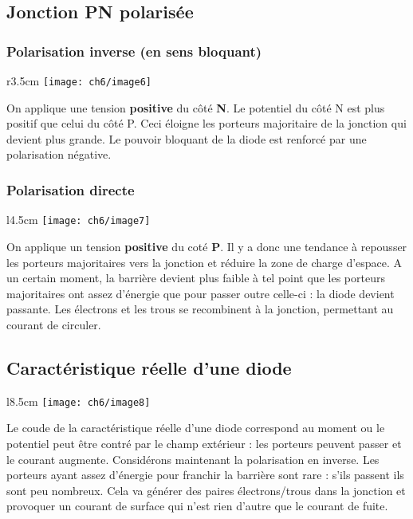 	\subsection{Jonction PN polarisée}
		 \subsubsection{Polarisation inverse (en sens bloquant)}
		 			\begin{wrapfigure}[4]{r}{3.5cm}
		\vspace{-0.8cm}
		\texttt{[image: ch6/image6]}
		\end{wrapfigure}	
		 On applique une tension \textbf{positive} du côté \textbf{N}. Le potentiel 
		 du côté N est plus positif que celui du côté P. Ceci éloigne les porteurs 
		 majoritaire de la jonction qui devient plus grande. Le pouvoir bloquant 
		 de la diode est renforcé par une polarisation négative.
		 
		 \subsubsection{Polarisation directe}
		\begin{wrapfigure}[6]{l}{4.5cm}
		\vspace{-0.5cm}
		\texttt{[image: ch6/image7]}
		\end{wrapfigure}
		 On applique un tension \textbf{positive} du coté \textbf{P}. Il y a donc 
		 une tendance à repousser les porteurs majoritaires vers la jonction et 
		 réduire la zone de charge d'espace. A un certain moment, la barrière devient 
		 plus faible à tel point que les porteurs majoritaires ont assez d'énergie 
		 que pour passer outre celle-ci : la diode devient passante. Les électrons 
		 et les trous se recombinent à la jonction, permettant au courant de circuler.
	
	
	
	\subsection{Caractéristique réelle d'une diode}
			\begin{wrapfigure}[8]{l}{8.5cm}
		\vspace{-0.5cm}
		\texttt{[image: ch6/image8]}
		\end{wrapfigure}
	Le coude de la caractéristique réelle d'une diode correspond au moment ou le potentiel 
	peut être contré par le champ extérieur : les porteurs peuvent passer et le courant 
	augmente. Considérons maintenant la polarisation en inverse. Les porteurs ayant 
	assez d'énergie pour franchir la barrière sont rare : s'ils passent ils sont 
	peu nombreux. Cela va générer des paires électrons/trous dans la jonction et 
	provoquer un courant de surface qui n'est rien d'autre que le courant de fuite.\\
	
